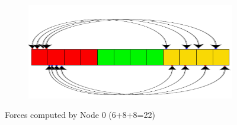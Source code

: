 \documentclass[a4paper]{article}
\begin{document}
\begin{figure}[ht]
\begin{subfigure}{.35\textwidth}
  \centering
  \includegraphics[width=1\linewidth]{array_proc_0_b_2}
\end{subfigure}
  \caption{Forces computed by Node 0 (6+8+8=22)}
  \label{fig:pr1}
\end{figure}
\FloatBarrier
\end{document}
